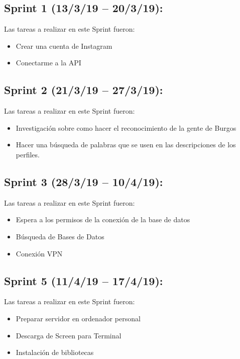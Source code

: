 \subsection{Sprint 1 (13/3/19 – 20/3/19):}

Las tareas a realizar en este Sprint fueron:
\begin{itemize}
    \item Crear una cuenta de Instagram
    \item Conectarme a la API
\end{itemize}


\subsection{Sprint 2 (21/3/19 – 27/3/19):}

Las tareas a realizar en este Sprint fueron:
\begin{itemize}
    \item Investigación sobre como hacer el reconocimiento de la gente de Burgos
    \item Hacer una búsqueda de palabras que se usen en las descripciones de los perfiles.
\end{itemize}


\subsection{Sprint 3 (28/3/19 – 10/4/19):}

Las tareas a realizar en este Sprint fueron:
\begin{itemize}
    \item Espera a los permisos de la conexión de la base de datos
    \item Búsqueda de Bases de Datos
    \item Conexión VPN
\end{itemize}

\subsection{Sprint 5 (11/4/19 – 17/4/19):}

Las tareas a realizar en este Sprint fueron:
\begin{itemize}
    \item Preparar servidor en ordenador personal
    \item Descarga de Screen para Terminal
    \item Instalación de bibliotecas
\end{itemize}

